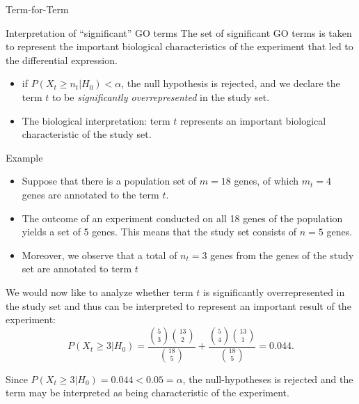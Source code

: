 \documentclass{beamer}
\begin{document}
\begin{frame}{Term-for-Term}

\begin{mybluebox}{Interpretation of ``significant'' GO terms}
The set of significant GO terms is taken to represent the important biological characteristics of the experiment that led to the differential expression.
\end{mybluebox}

  

\begin{itemize}
 \item if $P(X_t\geq n_t|H_0) < \alpha$, the null hypothesis is
rejected, and we declare the term $t$ to be \textit{significantly
overrepresented} in the study set.
\item The biological interpretation: term
$t$ represents an important biological characteristic of the study
set.
\end{itemize}
\end{frame}
\begin{frame}{Example}


\begin{itemize}
 \item  Suppose that there is a population set of $m=18$ genes, of which
  $m_t=4$ genes are annotated to the term $t$.
  \item The outcome of an
  experiment conducted on all 18 genes of the population yields a set
  of 5 genes. This means that the study set consists of $n=5$
  genes.
  \item Moreover, we observe that a total of $n_t=3$ genes from the
  genes of the study set are annotated to term
  $t$ 
\end{itemize}


  We would now like to analyze whether term $t$ is significantly
  overrepresented in the study set and thus can be interpreted to
  represent an important result of the experiment:
\[
P(X_t\geq 3|H_0) = \frac{\displaystyle{5 \choose 3}\displaystyle{{13} \choose {2}}}{\displaystyle{18 
\choose 5}} + \frac{\displaystyle{5 \choose 4}\displaystyle{{13} \choose {1}}}{\displaystyle{18 
\choose 5}}
   = 0.044.
\]
\begin{tiny}Since $P(X_t\geq 3|H_0)=0.044<0.05=\alpha$, the null-hypotheses is
rejected and the term may be interpreted as being characteristic of
the experiment.\end{tiny}

\end{frame}
\end{document}
